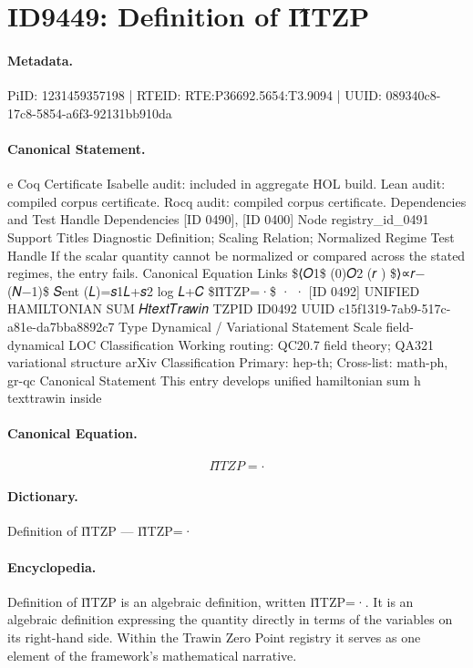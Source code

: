 \section*{ID9449: Definition of Π̂TZP}
\paragraph{Metadata.}
PiID: 1231459357198 | RTEID: RTE:P36692.5654:T3.9094 | UUID: 089340c8-17c8-5854-a6f3-92131bb910da

\paragraph{Canonical Statement.}
e Coq Certificate Isabelle audit: included in aggregate HOL build. Lean audit: compiled corpus certificate. Rocq audit: compiled corpus certificate. Dependencies and Test Handle Dependencies [ID 0490], [ID 0400] Node registry\_id\_0491 Support Titles Diagnostic Definition; Scaling Relation; Normalized Regime Test Handle If the scalar quantity cannot be normalized or compared across the stated regimes, the entry fails. Canonical Equation Links \$⟨𝑂1\$ (0)𝑂2 (𝑟 ) \$⟩∝𝑟−(𝑁−1)\$ 𝑆ent (𝐿)=𝑠1𝐿+𝑠2 log 𝐿+𝐶 \$Π̂TZP=·\$ · · [ID 0492] UNIFIED HAMILTONIAN SUM 𝐻𝑡𝑒𝑥𝑡𝑇𝑟𝑎𝑤𝑖𝑛 TZPID ID0492 UUID c15f1319-7ab9-517c-a81e-da7bba8892c7 Type Dynamical / Variational Statement Scale field-dynamical LOC Classification Working routing: QC20.7 field theory; QA321 variational structure arXiv Classification Primary: hep-th; Cross-list: math-ph, gr-qc Canonical Statement This entry develops unified hamiltonian sum h texttrawin inside

\paragraph{Canonical Equation.}
\[
Π̂TZP=·
\]

\paragraph{Dictionary.}
Definition of Π̂TZP — Π̂TZP=·

\paragraph{Encyclopedia.}
Definition of Π̂TZP is an algebraic definition, written Π̂TZP=·. It is an algebraic definition expressing the quantity directly in terms of the variables on its right-hand side. Within the Trawin Zero Point registry it serves as one element of the framework's mathematical narrative.
